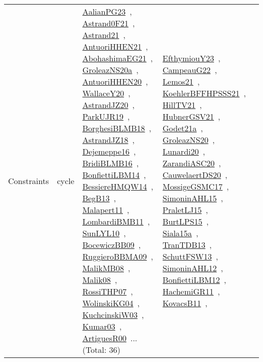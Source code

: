 {\begin{longtable}{lp{3cm}>{\raggedright\arraybackslash}p{6cm}>{\raggedright\arraybackslash}p{6cm}>{\raggedright\arraybackslash}p{8cm}}
Constraints & cycle & \href{works/AalianPG23.pdf}{AalianPG23}~\cite{AalianPG23}, \href{works/Astrand0F21.pdf}{Astrand0F21}~\cite{Astrand0F21}, \href{works/Astrand21.pdf}{Astrand21}~\cite{Astrand21}, \href{works/AntuoriHHEN21.pdf}{AntuoriHHEN21}~\cite{AntuoriHHEN21}, \href{works/AbohashimaEG21.pdf}{AbohashimaEG21}~\cite{AbohashimaEG21}, \href{works/GroleazNS20a.pdf}{GroleazNS20a}~\cite{GroleazNS20a}, \href{works/AntuoriHHEN20.pdf}{AntuoriHHEN20}~\cite{AntuoriHHEN20}, \href{works/WallaceY20.pdf}{WallaceY20}~\cite{WallaceY20}, \href{works/AstrandJZ20.pdf}{AstrandJZ20}~\cite{AstrandJZ20}, \href{works/ParkUJR19.pdf}{ParkUJR19}~\cite{ParkUJR19}, \href{works/BorghesiBLMB18.pdf}{BorghesiBLMB18}~\cite{BorghesiBLMB18}, \href{works/AstrandJZ18.pdf}{AstrandJZ18}~\cite{AstrandJZ18}, \href{works/Dejemeppe16.pdf}{Dejemeppe16}~\cite{Dejemeppe16}, \href{works/BridiBLMB16.pdf}{BridiBLMB16}~\cite{BridiBLMB16}, \href{works/BonfiettiLBM14.pdf}{BonfiettiLBM14}~\cite{BonfiettiLBM14}, \href{works/BessiereHMQW14.pdf}{BessiereHMQW14}~\cite{BessiereHMQW14}, \href{works/BegB13.pdf}{BegB13}~\cite{BegB13}, \href{works/Malapert11.pdf}{Malapert11}~\cite{Malapert11}, \href{works/LombardiBMB11.pdf}{LombardiBMB11}~\cite{LombardiBMB11}, \href{works/SunLYL10.pdf}{SunLYL10}~\cite{SunLYL10}, \href{works/BocewiczBB09.pdf}{BocewiczBB09}~\cite{BocewiczBB09}, \href{works/RuggieroBBMA09.pdf}{RuggieroBBMA09}~\cite{RuggieroBBMA09}, \href{works/MalikMB08.pdf}{MalikMB08}~\cite{MalikMB08}, \href{works/Malik08.pdf}{Malik08}~\cite{Malik08}, \href{works/RossiTHP07.pdf}{RossiTHP07}~\cite{RossiTHP07}, \href{works/WolinskiKG04.pdf}{WolinskiKG04}~\cite{WolinskiKG04}, \href{works/KuchcinskiW03.pdf}{KuchcinskiW03}~\cite{KuchcinskiW03}, \href{works/Kumar03.pdf}{Kumar03}~\cite{Kumar03}, \href{works/ArtiguesR00.pdf}{ArtiguesR00}~\cite{ArtiguesR00}... (Total: 36) & \href{works/EfthymiouY23.pdf}{EfthymiouY23}~\cite{EfthymiouY23}, \href{works/CampeauG22.pdf}{CampeauG22}~\cite{CampeauG22}, \href{works/Lemos21.pdf}{Lemos21}~\cite{Lemos21}, \href{works/KoehlerBFFHPSSS21.pdf}{KoehlerBFFHPSSS21}~\cite{KoehlerBFFHPSSS21}, \href{works/HillTV21.pdf}{HillTV21}~\cite{HillTV21}, \href{works/HubnerGSV21.pdf}{HubnerGSV21}~\cite{HubnerGSV21}, \href{works/Godet21a.pdf}{Godet21a}~\cite{Godet21a}, \href{works/GroleazNS20.pdf}{GroleazNS20}~\cite{GroleazNS20}, \href{works/Lunardi20.pdf}{Lunardi20}~\cite{Lunardi20}, \href{works/ZarandiASC20.pdf}{ZarandiASC20}~\cite{ZarandiASC20}, \href{works/CauwelaertDS20.pdf}{CauwelaertDS20}~\cite{CauwelaertDS20}, \href{works/MossigeGSMC17.pdf}{MossigeGSMC17}~\cite{MossigeGSMC17}, \href{works/SimoninAHL15.pdf}{SimoninAHL15}~\cite{SimoninAHL15}, \href{works/PraletLJ15.pdf}{PraletLJ15}~\cite{PraletLJ15}, \href{works/BurtLPS15.pdf}{BurtLPS15}~\cite{BurtLPS15}, \href{works/Siala15a.pdf}{Siala15a}~\cite{Siala15a}, \href{works/TranTDB13.pdf}{TranTDB13}~\cite{TranTDB13}, \href{works/SchuttFSW13.pdf}{SchuttFSW13}~\cite{SchuttFSW13}, \href{works/SimoninAHL12.pdf}{SimoninAHL12}~\cite{SimoninAHL12}, \href{works/BonfiettiLBM12.pdf}{BonfiettiLBM12}~\cite{BonfiettiLBM12}, \href{works/HachemiGR11.pdf}{HachemiGR11}~\cite{HachemiGR11}, \href{works/KovacsB11.pdf}{KovacsB11}~\cite{KovacsB11}, 
\end{longtable}}
